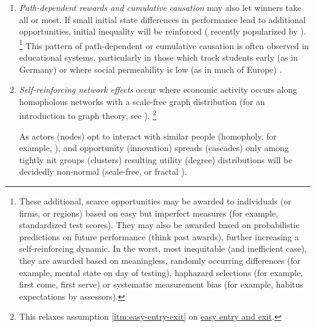 \begin{enumerate}
	The truth, as often, will lie somewhere in between, and greatly depend on circumstance.
	Some of the divergence between scalable and unscalable occupations will fall on workers, some on consumers and much will be split.
	\footnote{
	Such flexibility does justice to \cite{Baumol1965} original insight, which started out as an empirical observation on the relative pay of the performing arts, and not as an(other) \emph{iron} law of wages (cf.~\citealt{Malthus1798}).
	}
	\item {} \label{sec:cumulative-causation}
	\emph{Path-dependent rewards and cumulative causation} may also let winners take all or most.
	If small initial state differences in performance lead to additional opportunities, initial inequality will be reinforced (\citealt{Jackson1968, Merton1988} recently popularized by \citealt{Gladwell}).
	\footnote{
		These additional, scarce opportunities may be awarded to individuals (or firms, or regions) based on easy but imperfect measures (for example, standardized test scores).
		They may also be awarded based on probabilistic predictions on future performance (think past awards), further increasing a self-reinforcing dynamic.
		In the worst, most inequitable (and inefficient case), they are awarded based on meaningless, randomly occurring differences (for example, mental state on day of testing), haphazard selections (for example, first come, first serve) or systematic measurement bias (for example, habitus expectations by assessors).
	}
	This pattern of path-dependent or cumulative causation is often observed in educational systems, particularly in those which track students early (as in Germany) or where social permeability is low (as in much of Europe) \citep{OECD2006}.

	\item {} \label{sec:network-effects} \emph{Self-reinforcing network effects} occur where economic activity occurs along homopholous networks with a scale-free graph distribution (for an introduction to graph theory, see \citealt{Kleinberg-2009-oz}).
	\footnote{
		This relaxes  assumption \ref{itm:easy-entry-exit} on \hyperref[itm:easy-entry-exit]{easy entry and exit}.
	}

	As actors (nodes) opt to interact with similar people (homopholy, for example, \citealt{Mcpherson2001}), and opportunity (innovation) spreads (cascades) only among tightly nit groups (clusters) \citep{Bass1969} resulting utility (degree) distributions will be decidedly non-normal (scale-free, or fractal \citep{Mandelbrot2004}).


\end{enumerate}
